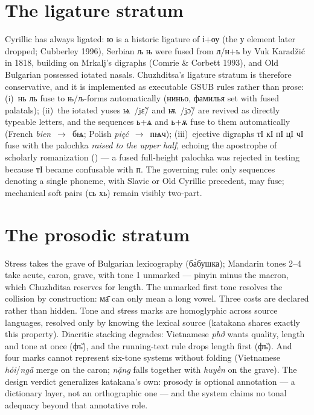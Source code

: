 \documentclass[11pt]{article}
\newcommand{\cz}[1]{{\chu #1}}
\newcommand{\ph}[1]{{\ipafont/#1/}}
\newcommand{\phon}[1]{{\ipafont[#1]}}
\begin{document}
\section{The ligature stratum}

Cyrillic has always ligated: \cz{ю} is a historic ligature of і+оу (the у element later dropped; Cubberley 1996), Serbian \cz{љ њ} were fused from л/н+ь by Vuk Karad\v{z}i\'c in 1818, building on Mrkalj's digraphs (Comrie \& Corbett 1993), and Old Bulgarian possessed iotated nasals. Chuzhditsa's ligature stratum is therefore conservative, and it is implemented as executable GSUB rules rather than prose: (i)~\cz{нь ль} fuse to њ/љ-forms automatically (\cz{ниньо}, \cz{фамилья} set with fused palatals); (ii)~the iotated yuses \cz{ѩ}~\ph{jɛ̃} and \cz{ѭ}~\ph{jɔ̃} are revived as directly typeable letters, and the sequences \cz{ь}+\cz{ѧ} and \cz{ь}+\cz{ѫ} fuse to them automatically (French \emph{bien}~$\rightarrow$~\cz{бѩ}; Polish \emph{pięć}~$\rightarrow$~\cz{пѩч}); (iii)~ejective digraphs \cz{тӀ кӀ пӀ цӀ чӀ} fuse with the palochka \emph{raised to the upper half}, echoing the apostrophe of scholarly romanization (\phon{tʼ kʼ}) — a fused full-height palochka was rejected in testing because \cz{тӀ} became confusable with \cz{п}. The governing rule: only sequences denoting a single phoneme, with Slavic or Old Cyrillic precedent, may fuse; mechanical soft pairs (\cz{сь хь}) remain visibly two-part.

\section{The prosodic stratum}

Stress takes the grave of Bulgarian lexicography (\cz{ба̀бушка}); Mandarin tones 2--4 take acute, caron, grave, with tone 1 unmarked — pinyin minus the macron, which Chuzhditsa reserves for length. The unmarked first tone resolves the collision by construction: \cz{ма̄} can only mean a long vowel. Three costs are declared rather than hidden. Tone and stress marks are homoglyphic across source languages, resolved only by knowing the lexical source (katakana shares exactly this property). Diacritic stacking degrades: Vietnamese \emph{phở} wants quality, length and tone at once (\cz{фъ̄̌}), and the running-text rule drops length first (\cz{фъ̌}). And four marks cannot represent six-tone systems without folding (Vietnamese \emph{hỏi}/\emph{ngã} merge on the caron; \emph{nặng} falls together with \emph{huyền} on the grave). The design verdict generalizes katakana's own: prosody is optional annotation — a dictionary layer, not an orthographic one — and the system claims no tonal adequacy beyond that annotative role.
\end{document}
